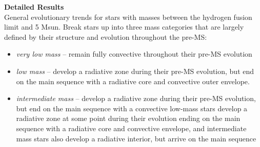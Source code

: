 \textbf{Detailed Results} \\
General evolutionary trends for stars with masses between the hydrogen fusion limit and 5 Msun. Break stars up into three mass categories that are largely defined by their structure and evolution throughout the pre-MS: 
\begin{itemize}
 \item[] {\it very low mass} -- remain fully convective throughout their pre-MS evolution
 \item[] {\it low mass} -- develop a radiative zone during their pre-MS evolution, but end on the main sequence with a radiative core and convective outer envelope.
 \item[] {\it intermediate mass} -- develop a radiative zone during their pre-MS evolution, but end on the main sequence with a convective
low-mass stars develop a radiative zone at some point during their evolution ending on the main sequence with a radiative core and convective envelope, and intermediate mass stars also develop a radiative interior, but arrive on the main sequence
\end{itemize}